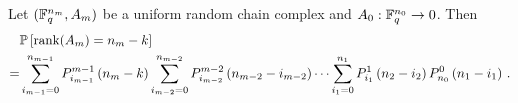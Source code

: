 


\begin{theorem}\label{thmProbranks}
Let $(\mathbb{F}_q^{n_m}, A_m)$ be a uniform random chain complex 
and $A_0:\mathbb{F}_q^{n_0}\to 0$.  Then
\begin{align*}
 &  \mathbb{P}\left[\operatorname{\mathrm{rank}}(A_{m}) = n_{m} - k\right]\\
=& 	\sum_{i_{m-1}=0}^{n_{m-1}} P_{i_{m-1}}^{m-1}\left(n_{m} -k\right)
	\sum_{i_{m-2}=0}^{n_{m-2}} P_{i_{m-2}}^{m-2}\left(n_{m-2} - i_{m-2}\right)
		\cdots
        \sum_{i_1 = 0}^{n_1} P_{i_1}^1\left(n_2 - i_2\right) P_{n_0}^0 \left(n_1 - i_1\right) \, .
\end{align*}
\end{theorem}
